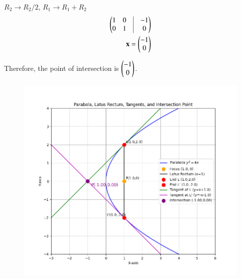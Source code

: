 \documentclass[journal]{IEEEtran}
\begin{document}
   $R_2\rightarrow R_2/2$, $R_1\rightarrow R_1+R_2$
   \begin{align}
   \myvec{
   1 & 0 & \vrule & -1\\ 0 & 1 & \vrule & 0
   }\\
   \vec{x}=\myvec{-1\\0}
   \end{align}
   
Therefore, the point of intersection is $\begin{pmatrix}-1 \\ 0\end{pmatrix}$.


\begin{figure}[H]
\centering
\includegraphics[width=0.7\columnwidth]{figs/mat181.png}
\caption{}
\label{fig:1}
\end{figure}
\end{document}
